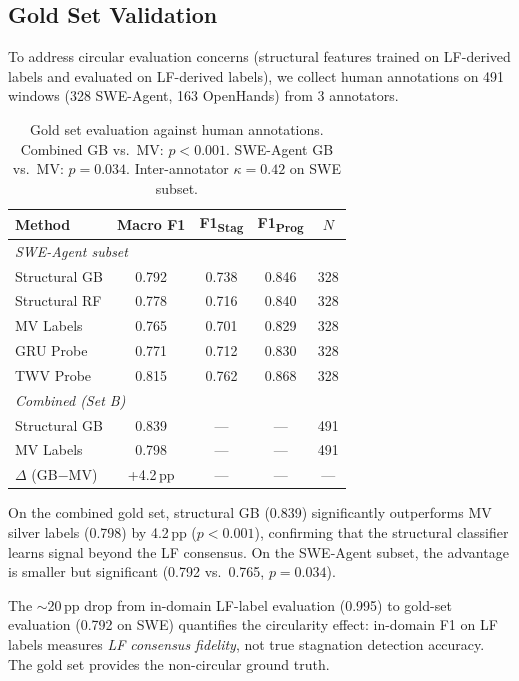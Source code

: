 \documentclass[11pt,a4paper]{article}
\begin{document}
\subsection{Gold Set Validation}
\label{sec:exp-gold}

To address circular evaluation concerns (structural features trained on LF-derived labels and evaluated on LF-derived labels), we collect human annotations on 491 windows (328 SWE-Agent, 163 OpenHands) from 3 annotators.

\begin{table}[t]
\centering
\small
\begin{tabular}{lcccc}
\toprule
\textbf{Method} & \textbf{Macro F1} & \textbf{F1\textsubscript{Stag}} & \textbf{F1\textsubscript{Prog}} & \textbf{$N$} \\
\midrule
\multicolumn{5}{l}{\emph{SWE-Agent subset}} \\
Structural GB & 0.792 & 0.738 & 0.846 & 328 \\
Structural RF & 0.778 & 0.716 & 0.840 & 328 \\
MV Labels & 0.765 & 0.701 & 0.829 & 328 \\
GRU Probe & 0.771 & 0.712 & 0.830 & 328 \\
TWV Probe & 0.815 & 0.762 & 0.868 & 328 \\
\midrule
\multicolumn{5}{l}{\emph{Combined (Set B)}} \\
Structural GB & 0.839 & --- & --- & 491 \\
MV Labels & 0.798 & --- & --- & 491 \\
$\Delta$ (GB$-$MV) & +4.2\,pp & --- & --- & --- \\
\bottomrule
\end{tabular}
\caption{Gold set evaluation against human annotations. Combined GB vs.\ MV: $p < 0.001$. SWE-Agent GB vs.\ MV: $p = 0.034$. Inter-annotator $\kappa = 0.42$ on SWE subset.}
\label{tab:gold}
\end{table}

On the combined gold set, structural GB (0.839) significantly outperforms MV silver labels (0.798) by 4.2\,pp ($p < 0.001$), confirming that the structural classifier learns signal beyond the LF consensus.
On the SWE-Agent subset, the advantage is smaller but significant (0.792 vs.\ 0.765, $p = 0.034$).

The $\sim$20\,pp drop from in-domain LF-label evaluation (0.995) to gold-set evaluation (0.792 on SWE) quantifies the circularity effect: in-domain F1 on LF labels measures \emph{LF consensus fidelity}, not true stagnation detection accuracy.
The gold set provides the non-circular ground truth.
\end{document}
